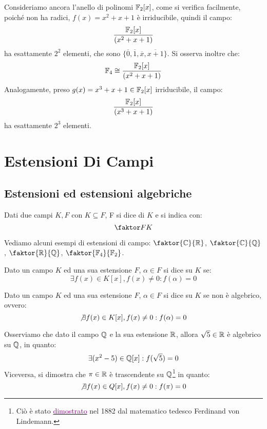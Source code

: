 \documentclass[11pt]{scrartcl}
\begin{document}
\begin{example}
Consideriamo ancora l'anello di polinomi $\mathbb F_2[x]$, come si verifica facilmente, poiché non ha radici, $f(x)=x^2+x+1$ è irriducibile, quindi il campo:
	\[ \frac{\mathbb F_2[x]}{(x^2+x+1)}
	\]
ha esattamente $2^2$ elementi, che sono $\{\overline 0, \overline 1, \overline x, \overline{x+1}\}$. Si osserva inoltre che:
	\[ \mathbb F_4 \cong \frac{\mathbb F_2[x]}{(x^2+x+1)}
	\] 
Analogamente, preso $g(x) = x^3 + x + 1 \in \mathbb F_2[x]$ irriducibile, il campo:
	\[  \frac{\mathbb F_2[x]}{(x^3+x+1)}
	\]
ha esattamente $2^3$ elementi.
\end{example}


\newpage

\section{Estensioni Di Campi}
\subsection{Estensioni ed estensioni algebriche}
\begin{definition}
Dati due campi $K,F$ con $K \subseteq F$, F si dice  di $K$ e si indica con:
	\[ \faktor FK
	\]
\end{definition}
 
\begin{example}
Vediamo alcuni esempi di estensioni di campo: $\faktor{\CC}{\RR}$, $\faktor{\CC}{\QQ}$, $\faktor{\RR}{\QQ}$, $\faktor{\FF_4}{\FF_2}$.
\end{example}

\begin{definition}
Dato un campo $K$ ed una sua estensione $F$, $\alpha \in F$ si dice  su $K$ se:
	\[ \exists f(x) \in K[x], f(x) \ne 0 : f(\alpha) = 0
	\] 
\end{definition}

\begin{definition}
Dato un campo $K$ ed una sua estensione $F$, $\alpha \in F$ si dice  su $K$ se non è algebrico, ovvero:
	\[ \not\exists f(x) \in K[x], f(x) \ne 0 : f(\alpha) = 0
	\] 
\end{definition}

\begin{example}
Osserviamo che dato il campo $\mathbb Q$ e la sua estensione $\mathbb R$, allora $\sqrt 5 \in \mathbb R$ è algebrico su $\mathbb Q$, in quanto:
	\[ \exists (x^2 - 5) \in \mathbb Q[x] : f(\sqrt 5) = 0
	\]
Viceversa, si dimostra che $\pi \in \mathbb R$ è trascendente su $\mathbb Q$\footnote{Ciò è stato \href{http://it.wikipedia.org/wiki/Teorema_di_Lindemann-Weierstrass}{\textcolor{purple}{dimostrato}} nel 1882 dal matematico tedesco Ferdinand von
Lindemann.} in quanto:
	\[ \not\exists f(x) \in Q[x], f(x) \ne 0 : f(\pi) = 0
	\]
\end{example}
\end{document}
